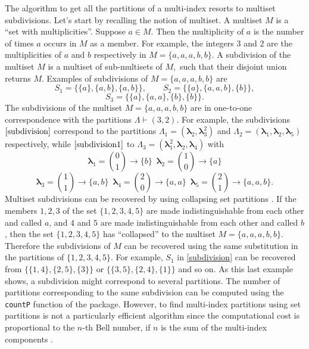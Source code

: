 The algorithm to get all the partitions of a multi-index resorts to
multiset subdivisions. Let's start by recalling the notion of multiset.
A multiset \(M\) is a ``set with multiplicities''. Suppose \(a \in M.\)
Then the multiplicity of \(a\) is the number of times \(a\) occurs in
\(M\) as a member. For example, the integers \(3\) and \(2\) are the
multiplicities of \(a\) and \(b\) respectively in \(M = \{a,a,a,b,b\}.\)
A subdivision of the multiset \(M\) is a multiset of sub-multisets of
\(M,\) such that their disjoint union returns \(M\). Examples of
subdivisions of \(M = \{a,a,a,b,b\}\) are \begin{equation}
S_1 = \{\{a\},\{a,b\},\{a,b\}\}, \qquad 
S_2 = \{\{a\},\{a,a,b\},\{b\}\}, 
\label{subdivision}
\end{equation} \begin{equation}
S_3  = \{\{a\},\{a,a\},\{b\},\{b\}\}.
\label{subdivision1}
\end{equation} The subdivisions of the multiset \(M = \{a,a,a,b,b\}\)
are in one-to-one correspondence with the partitions
\(\Lambda \vdash (3,2).\) For example, the subdivisions
\(\eqref{subdivision}\) correspond to the partitions
\(\Lambda_1 = (\boldsymbol{\lambda}_2, \boldsymbol{\lambda}_3^2)\) and
\(\Lambda_2 = (\boldsymbol{\lambda}_1, \boldsymbol{\lambda}_2,\boldsymbol{\lambda}_5)\)
respectively, while \(\eqref{subdivision1}\) to
\(\Lambda_3 = (\boldsymbol{\lambda}_1^2, \boldsymbol{\lambda}_2,\boldsymbol{\lambda}_4)\)
with
\[ \boldsymbol{\lambda}_1={0 \choose 1} \! \rightarrow \! \{b\} \,\,\, \boldsymbol{\lambda}_2={1 \choose 0}  \! \rightarrow \! \{a\}\]
\[\boldsymbol{\lambda}_3={1 \choose 1}  \! \rightarrow \! \{a,b\} \,\,\, \boldsymbol{\lambda}_4={2 \choose 0}  \! \rightarrow \! \{a,a\} \,\,\,  \boldsymbol{\lambda}_5={2 \choose 1}  \! \rightarrow \!\{a,a,b\}.\]
Multiset subdivisions can be recovered by using collapsing set
partitions \citep{MR2200529}. If the members \(1, 2, 3\) of the set
\(\{ 1, 2, 3, 4, 5\}\) are made indistinguishable from each other and
called \(a\), and \(4\) and \(5\) are made indistinguishable from each
other and called \(b\), then the set \(\{ 1, 2, 3, 4, 5\}\) has
``collapsed'' to the multiset \(M = \{a,a,a,b,b\}.\) Therefore the
subdivisions of \(M\) can be recovered using the same substitution in
the partitions of \(\{ 1, 2, 3, 4, 5\}.\) For example, \(S_1\) in
\eqref{subdivision} can be recovered from \(\{\{1,4\},\{2,5\}, \{3\}\}\)
or \(\{\{3,5\},\{2,4\}, \{1\}\}\) and so on. As this last example shows,
a subdivision might correspond to several partitions. The number of
partitions corresponding to the same subdivision can be computed using
the \texttt{countP} function of the package. However, to find
multi-index partitions using set partitions is not a particularly
efficient algorithm since the computational cost is proportional to the
\(n\)-th Bell number, if \(n\) is the sum of the multi-index components
\citep{MR1937238}.

